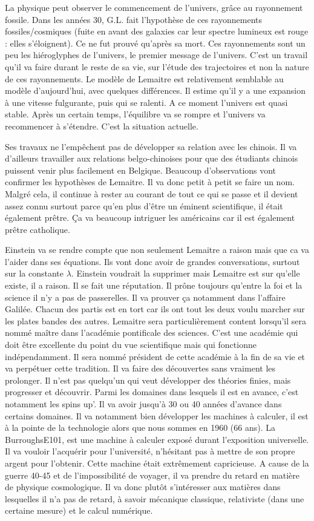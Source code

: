 \documentclass[11pt,a4paper]{article} %
\begin{document}
La physique peut observer le commencement de l'univers, grâce au rayonnement fossile.
Dans les années 30, G.L.
fait l'hypothèse de ces rayonnements fossiles/cosmiques (fuite en avant des galaxies car leur spectre lumineux est rouge : elles s'éloignent).
Ce ne fut prouvé qu'après sa mort.
Ces rayonnements sont un peu les hiéroglyphes de l'univers, le premier message de l'univers.
C'est un travail qu'il va faire durant le reste de sa vie, sur l'étude des trajectoires et non la nature de ces rayonnements.
Le modèle de Lemaitre est relativement semblable au modèle d'aujourd'hui, avec quelques différences.
Il estime qu'il y a une expansion à une vitesse fulgurante, puis qui se ralenti.
A ce moment l'univers est quasi stable.
Après un certain temps, l'équilibre va se rompre et l'univers va recommencer à s'étendre.
C'est la situation actuelle.

Ses travaux ne l'empêchent pas de développer sa relation avec les chinois.
Il va d'ailleurs travailler aux relations belgo-chinoises pour que des étudiants chinois puissent venir plus facilement en Belgique.
Beaucoup d'observations vont confirmer les hypothèses de Lemaitre.
Il va donc petit à petit se faire un nom.
Malgré cela, il continue à rester au courant de tout ce qui se passe et il devient assez connu surtout parce qu'en plus d'être un éminent scientifique, il était également prêtre.
Ça va beaucoup intriguer les américains car il est également prêtre catholique.

Einstein va se rendre compte que non seulement Lemaitre a raison mais que ca va l'aider dans ses équations.
Ils vont donc avoir de grandes conversations, surtout sur la constante $\lambda$.
Einstein voudrait la supprimer mais Lemaitre est sur qu'elle existe, il a raison.
Il se fait une réputation.
Il prône toujours qu'entre la foi et la science il n'y a pas de passerelles.
Il va prouver ça notamment dans l'affaire Galilée.
Chacun des partis est en tort car ils ont tout les deux voulu marcher sur les plates bandes des autres.
Lemaitre sera particulièrement content lorsqu'il sera nommé maître dans l'académie pontificale des sciences.
C'est une académie qui doit être excellente du point du vue scientifique mais qui fonctionne indépendamment.
Il sera nommé président de cette académie à la fin de sa vie et va perpétuer cette tradition.
Il va faire des découvertes sans vraiment les prolonger.
Il n'est pas quelqu'un qui veut développer des théories finies, mais progresser et découvrir.
Parmi les domaines dans lesquels il est en avance, c'est notamment les spins up'.
Il va avoir jusqu'à 30 ou 40 années d'avance dans certains domaines.
Il va notamment bien développer les machines à calculer, il est à la pointe de la technologie alors que nous sommes en 1960 (66 ans).
La BurroughsE101, est une machine à calculer exposé durant l'exposition universelle.
Il va vouloir l'acquérir pour l'université, n'hésitant pas à mettre de son propre argent pour l'obtenir.
Cette machine était extrêmement capricieuse.
 A cause de la guerre 40-45 et de l'impossibilité de voyager, il va prendre du retard en matière de physique cosmologique.
Il va donc plutôt s'intéresser aux matières dans lesquelles il n'a pas de retard, à savoir mécanique classique, relativiste (dans une certaine mesure) et le calcul numérique.
\end{document}
